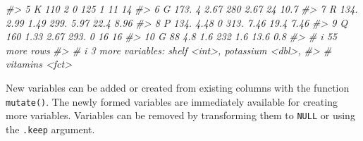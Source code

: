 \documentclass[
]{book}
\newenvironment{Shaded}{\begin{snugshade}}{\end{snugshade}}
\newcommand{\CommentTok}[1]{\textcolor[rgb]{0.56,0.35,0.01}{\textit{#1}}}
\begin{document}
\begin{Shaded}
\begin{Highlighting}[]
\CommentTok{\#\textgreater{}  5 K         110     2     0      125   1     11    14   }
\CommentTok{\#\textgreater{}  6 G         173.    4     2.67   280   2.67  24    10.7 }
\CommentTok{\#\textgreater{}  7 R         134.    2.99  1.49   299.  5.97  22.4   8.96}
\CommentTok{\#\textgreater{}  8 P         134.    4.48  0      313.  7.46  19.4   7.46}
\CommentTok{\#\textgreater{}  9 Q         160     1.33  2.67   293.  0     16    16   }
\CommentTok{\#\textgreater{} 10 G          88     4.8   1.6    232   1.6   13.6   0.8 }
\CommentTok{\#\textgreater{} \# i 55 more rows}
\CommentTok{\#\textgreater{} \# i 3 more variables: shelf \textless{}int\textgreater{}, potassium \textless{}dbl\textgreater{},}
\CommentTok{\#\textgreater{} \#   vitamins \textless{}fct\textgreater{}}
\end{Highlighting}
\end{Shaded}

New variables can be added or created from existing columns with the function \texttt{mutate()}. The newly formed variables are immediately available for creating more variables. Variables can be removed by transforming them to \texttt{NULL} or using the \texttt{.keep} argument.
\end{document}
